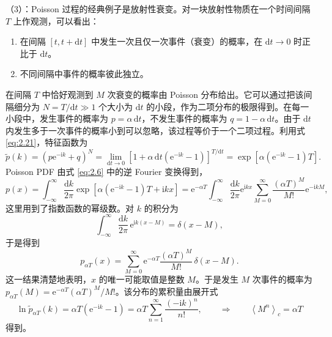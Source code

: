 （3）：Poisson 过程的经典例子是放射性衰变。对一块放射性物质在一个时间间隔 $T$ 上作观测，可以看出：

\begin{enumerate}[label=(\alph*),itemsep=0.25em,topsep=0.4em]
  \item 在间隔 $[t,t+\mathrm{d}t]$ 中发生一次且仅一次事件（衰变）的概率，在 $\mathrm{d}t\to0$ 时正比于 $\mathrm{d}t$。
  \item 不同间隔中事件的概率彼此独立。
\end{enumerate}


在间隔 $T$ 中恰好观测到 $M$ 次衰变的概率由 Poisson 分布给出。它可以通过把该间隔细分为 $N=T/\mathrm{d}t\gg1$ 个大小为 $\mathrm{d}t$ 的小段，作为二项分布的极限得到。在每一小段中，发生事件的概率为 $p=\alpha\,\mathrm{d}t$，不发生事件的概率为 $q=1-\alpha\,\mathrm{d}t$。由于 $\mathrm{d}t$ 内发生多于一次事件的概率小到可以忽略，该过程等价于一个二项过程。利用式 \eqref{eq:2.21}，特征函数为
\begin{equation}\label{eq:2.25}
  \tilde p(k)=\left(p\mathrm{e}^{-\mathrm{i}k}+q\right)^N=\lim_{\mathrm{d}t\to0}\left[1+\alpha\,\mathrm{d}t\left(\mathrm{e}^{-\mathrm{i}k}-1\right)\right]^{T/\mathrm{d}t}=\exp\left[\alpha\left(\mathrm{e}^{-\mathrm{i}k}-1\right)T\right].
\end{equation}
Poisson PDF 由式 \eqref{eq:2.6} 中的逆 Fourier 变换得到，
\begin{equation}\label{eq:2.26}
  p(x)=\int_{-\infty}^{\infty}\frac{\mathrm{d}k}{2\pi}\exp\left[\alpha\left(\mathrm{e}^{-\mathrm{i}k}-1\right)T+\mathrm{i}kx\right]=\mathrm{e}^{-\alpha T}\int_{-\infty}^{\infty}\frac{\mathrm{d}k}{2\pi}\mathrm{e}^{\mathrm{i}kx}\sum_{M=0}^{\infty}\frac{(\alpha T)^M}{M!}\mathrm{e}^{-\mathrm{i}kM},
\end{equation}
这里用到了指数函数的幂级数。对 $k$ 的积分为
\begin{equation}\label{eq:2.27}
  \int_{-\infty}^{\infty}\frac{\mathrm{d}k}{2\pi}\,\mathrm{e}^{\mathrm{i}k(x-M)}=\delta(x-M),
\end{equation}
于是得到
\begin{equation}\label{eq:2.28}
  p_{\alpha T}(x)=\sum_{M=0}^{\infty}\mathrm{e}^{-\alpha T}\frac{(\alpha T)^M}{M!}\,\delta(x-M).
\end{equation}
这一结果清楚地表明，$x$ 的唯一可能取值是整数 $M$。于是发生 $M$ 次事件的概率为 $p_{\alpha T}(M)=\mathrm{e}^{-\alpha T}(\alpha T)^M/M!$。该分布的累积量由展开式
\begin{equation}\label{eq:2.29}
  \ln\tilde p_{\alpha T}(k)=\alpha T\left(\mathrm{e}^{-\mathrm{i}k}-1\right)=\alpha T\sum_{n=1}^{\infty}\frac{(-\mathrm{i}k)^n}{n!},\qquad\Longrightarrow\qquad \left\langle M^n\right\rangle_c=\alpha T
\end{equation}
得到。

